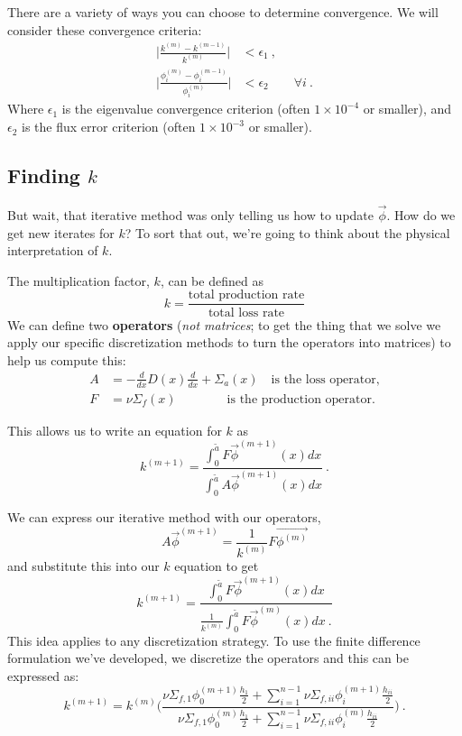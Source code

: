 \documentclass[12pt]{article}
\newcommand{\ve}[1]{\ensuremath{\mathbf{#1}}}
\begin{document}
There are a variety of ways you can choose to determine convergence. We will consider these convergence criteria:
\begin{align}
\bigg|\frac{k^{(m)} - k^{(m-1)}}{k^{(m)}}\bigg| &< \epsilon_1 \:, \nonumber \\
\bigg|\frac{\phi_i^{(m)} - \phi_i^{(m-1)}}{\phi_i^{(m)}}\bigg| &< \epsilon_2 \qquad \forall i\:. \nonumber
\end{align}
%
Where $\epsilon_1$ is the eigenvalue convergence criterion (often $1 \times 10^{-4}$ or smaller), and $\epsilon_2$ is the flux error criterion (often $1 \times 10^{-3}$ or smaller).

\subsection*{Finding $k$}

But wait, that iterative method was only telling us how to update $\vec{\phi}$. How do we get new iterates for $k$? To sort that out, we're going to think about the physical interpretation of $k$.

The multiplication factor, $k$, can be defined as
\[k = \frac{\text{total production rate}}{\text{total loss rate}}\]
%
We can define two \textbf{operators} (\emph{not matrices}; to get the thing that we solve we apply our specific discretization methods to turn the operators into matrices) to help us compute this:
%
\begin{align}
A &= -\frac{d}{dx}D(x)\frac{d}{dx} + \Sigma_a(x) \quad \text{is the loss operator,} \nonumber \\
F &= \nu\Sigma_f(x) \qquad \qquad \text{is the production operator.}\nonumber
\end{align}

This allows us to write an equation for $k$ as
\[k^{(m+1)} = \frac{\int_0^{\tilde{a}} F \vec{\phi}^{(m+1)}(x)dx}{\int_0^{\tilde{a}} A \vec{\phi}^{(m+1)}(x)dx}\:. \]

We can express our iterative method with our operators,
\[ A \vec{\phi}^{(m+1)} = \frac{1}{k^{(m)}}F\vec{\phi^{(m)}}\]
%
and substitute this into our $k$ equation to get
\[k^{(m+1)} = \frac{\int_0^{\tilde{a}} F \vec{\phi}^{(m+1)}(x)dx}{\frac{1}{k^{(m)}}\int_0^{\tilde{a}} F \vec{\phi}^{(m)}(x)dx\:.} \]
%
This idea applies to any discretization strategy. To use the finite difference formulation we've developed, we discretize the operators and this can be expressed as:
\[k^{(m+1)} = k^{(m)}\Biggl(\frac{\nu\Sigma_{f,1} \phi_0^{(m+1)} \frac{h_1}{2} + \sum_{i=1}^{n-1} \nu\Sigma_{f,ii} \phi_i^{(m+1)} \frac{h_{ii}}{2}}
{\nu\Sigma_{f,1} \phi_0^{(m)} \frac{h_1}{2} + \sum_{i=1}^{n-1} \nu\Sigma_{f,ii} \phi_i^{(m)} \frac{h_{ii}}{2}}\Biggr)\:.\]
\end{document}
